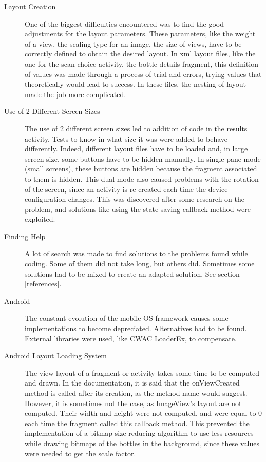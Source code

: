 \begin{description}

	\item[Layout Creation] One of the biggest difficulties encountered was to find the good adjustments for the layout parameters. These parameters, like the weight of a view, the scaling type for an image, the size of views, have to be correctly defined to obtain the desired layout. In xml layout files, like the one for the scan choice activity, the bottle details fragment, this definition of values was made through a process of trial and errors, trying values that theoretically would lead to success. In these files, the nesting of layout made the job more complicated.
	
	\item[Use of 2 Different Screen Sizes] The use of 2 different screen sizes led to addition of code in the results activity. Tests to know in what size it was were added to behave differently. Indeed, different layout files have to be loaded and, in large screen size, some buttons have to be hidden manually. In single pane mode (small screens), these buttons are hidden because the fragment associated to them is hidden. This dual mode also caused problems with the rotation of the screen, since an activity is re-created each time the device configuration changes. This was discovered after some research on the problem, and solutions like using the state saving callback method were exploited.
	
	\item[Finding Help] A lot of search was made to find solutions to the problems found while coding. Some of them did not take long, but others did. Sometimes some solutions had to be mixed to create an adapted solution. See section \ref{references}.
	
	\item[Android] The constant evolution of the mobile OS framework causes some implementations to become depreciated. Alternatives had to be found. External libraries were used, like CWAC LoaderEx, to compensate.
	
	\item[Android Layout Loading System] The view layout of a fragment or activity takes some time to be computed and drawn. In the documentation, it is said that the onViewCreated method is called after its creation, as the method name would suggest. However, it is sometimes not the case, as ImageView's layout are not computed. Their width and height were not computed, and were equal to 0 each time the fragment called this callback method. This prevented the implementation of a bitmap size reducing algorithm to use less resources while drawing bitmaps of the bottles in the background, since these values were needed to get the scale factor.
\end{description}

